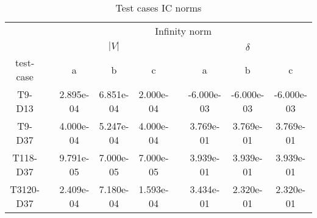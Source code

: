 \begin{table}
\renewcommand{\arraystretch}{1.3}
\centering
\label{}\hspace{2cm}\caption{Test cases IC norms}
\begin{adjustbox}{width=1\textwidth} %
\small
\begin{tabular}{ccccccccc}
\toprule
{} && \multicolumn{7}{c}{Infinity norm}   \\
\cmidrule{3-9}
{} && \multicolumn{3}{c}{$|V|$} && \multicolumn{3}{c}{$\delta$}  \\
\cmidrule{3-5}\cmidrule{7-9}
 test-case &&        a &        b &       c &&        a &       b &        c \\
\midrule
T9-D13    &&  2.895e-04 &  6.851e-04 &  2.000e-04 &&  -6.000e-03 &  -6.000e-03 &  -6.000e-03 \\
T9-D37    &&  4.000e-04 &  5.247e-04 &  4.000e-04 &&   3.769e-01 &   3.769e-01 &   3.769e-01 \\
T118-D37  &&  9.791e-05 &  7.000e-05 &  7.000e-05 &&   3.939e-01 &   3.939e-01 &   3.939e-01 \\
T3120-D37 &&  2.409e-04 &  7.180e-04 &  1.593e-04 &&   3.434e-01 &   2.320e-01 &   2.320e-01 \\
\bottomrule
\end{tabular}
\end{adjustbox}
\end{table}